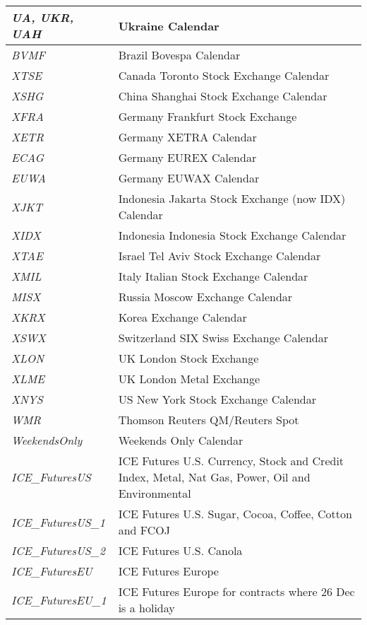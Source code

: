 \begin{longtable}{| p{} | p{} |}
    \emph{UA, UKR, UAH} & Ukraine Calendar \\ \hline
    \emph{BVMF} & Brazil Bovespa Calendar \\ \hline
    \emph{XTSE} & Canada Toronto Stock Exchange Calendar \\ \hline
    \emph{XSHG} & China Shanghai Stock Exchange Calendar \\ \hline
    \emph{XFRA} & Germany Frankfurt Stock Exchange \\ \hline
    \emph{XETR} & Germany XETRA Calendar \\ \hline
    \emph{ECAG} & Germany EUREX Calendar \\ \hline
    \emph{EUWA} & Germany EUWAX Calendar \\ \hline
    \emph{XJKT} & Indonesia Jakarta Stock Exchange (now IDX) Calendar \\ \hline
    \emph{XIDX} & Indonesia Indonesia Stock Exchange Calendar \\ \hline
    \emph{XTAE} & Israel Tel Aviv Stock Exchange Calendar \\ \hline
    \emph{XMIL} & Italy Italian Stock Exchange Calendar \\ \hline
    \emph{MISX} & Russia Moscow Exchange Calendar \\ \hline
    \emph{XKRX} & Korea Exchange Calendar \\ \hline
    \emph{XSWX} & Switzerland SIX Swiss Exchange Calendar \\ \hline
    \emph{XLON} & UK London Stock Exchange \\ \hline
    \emph{XLME} & UK London Metal Exchange \\ \hline
    \emph{XNYS} & US New York Stock Exchange Calendar \\ \hline
    \emph{WMR} & Thomson Reuters QM/Reuters Spot \\ \hline
    \emph{WeekendsOnly} & Weekends Only Calendar \\ \hline
    \emph{ICE\_FuturesUS} & ICE Futures U.S. Currency, Stock and Credit Index, Metal, Nat Gas, Power, Oil and Environmental \\ \hline
    \emph{ICE\_FuturesUS\_1} & ICE Futures U.S. Sugar, Cocoa, Coffee, Cotton and FCOJ \\ \hline
    \emph{ICE\_FuturesUS\_2} & ICE Futures U.S. Canola \\ \hline
    \emph{ICE\_FuturesEU} & ICE Futures Europe \\ \hline
    \emph{ICE\_FuturesEU\_1} & ICE Futures Europe for contracts where 26 Dec is a holiday \\ \hline

\end{longtable}
